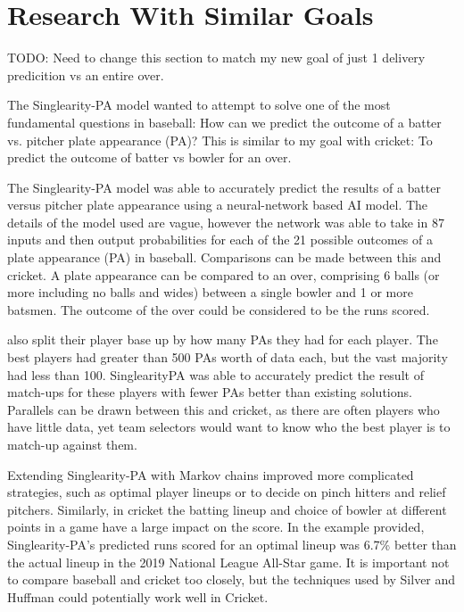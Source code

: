 \documentclass[12pt,a4paper]{report}
\theoremstyle{definition}
\begin{document}
\section{Research With Similar Goals}

TODO: Need to change this section to match my new goal of just 1 delivery predicition vs an entire over.

The Singlearity-PA model \citep{silver2021baseball} wanted to attempt to solve one of the most fundamental questions in baseball:	 How can we	predict the outcome of a batter	vs. pitcher plate appearance (PA)? 
This is similar to my goal with cricket:  To predict the outcome of batter vs bowler for an over.

The Singlearity-PA model \citep{silver2021baseball} was able to accurately predict the results of a batter versus pitcher plate appearance using a neural-network based AI model. 
The details of the model used are vague, however the network was able to take in 87 inputs and then output probabilities for each of the 21 possible outcomes of a plate appearance (PA) in baseball. 
Comparisons can be made between this and cricket. 
A plate appearance can be compared to an over, comprising 6 balls (or more including no balls and wides) between a single bowler and 1 or more batsmen. 
The outcome of the over could be considered to be the runs scored. 

\citet{silver2021baseball} also split their player base up by how many PAs they had for each player. 
The best players had greater than 500 PAs worth of data each, but the vast majority had less than 100. 
SinglearityPA was able to accurately predict the result of match-ups for these players with fewer PAs better than existing solutions. 
Parallels can be drawn between this and cricket, as there are often players who have little data, yet team selectors would want to know who the best player is to match-up against them.

Extending Singlearity-PA with Markov chains improved more complicated strategies, such as optimal player lineups or to decide on pinch hitters and relief pitchers. 
Similarly, in cricket the batting lineup and choice of bowler at different points in a game have a large impact on the score. 
In the example provided, Singlearity-PA's predicted runs scored for an optimal lineup was 6.7\% better than the actual lineup in the 2019 National League All-Star game. 
It is important not to compare baseball and cricket too closely, but the techniques used by Silver and Huffman could potentially work well in Cricket.
\end{document}
